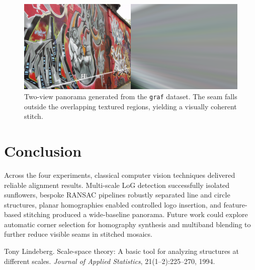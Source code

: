 ﻿\documentclass[11pt,a4paper]{article}
\begin{document}
\begin{figure}[H]
  \centering
  \includegraphics[width=0.9\linewidth]{stitching_result.png}
  \caption{Two-view panorama generated from the \texttt{graf} dataset. The seam falls outside the overlapping textured regions, yielding a visually coherent stitch.}
  \label{fig:stitching}
\end{figure}

\section{Conclusion}
Across the four experiments, classical computer vision techniques delivered reliable alignment results. Multi-scale LoG detection successfully isolated sunflowers, bespoke RANSAC pipelines robustly separated line and circle structures, planar homographies enabled controlled logo insertion, and feature-based stitching produced a wide-baseline panorama. Future work could explore automatic corner selection for homography synthesis and multiband blending to further reduce visible seams in stitched mosaics.


\begin{thebibliography}{1}

Tony Lindeberg.
\newblock Scale-space theory: A basic tool for analyzing structures at different scales.
\newblock \emph{Journal of Applied Statistics}, 21(1--2):225--270, 1994.

\end{thebibliography}
\end{document}
